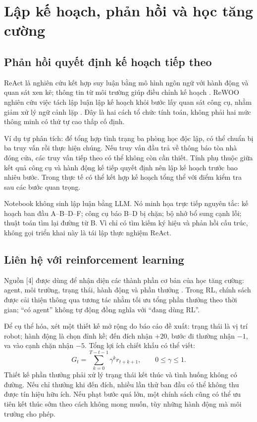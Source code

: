 \documentclass[12pt,a4paper]{article}
\begin{document}
\par
\section{Lập kế hoạch, phản hồi và học tăng cường}
\subsection{Phản hồi quyết định kế hoạch tiếp theo}
ReAct là nghiên cứu kết hợp suy luận bằng mô hình ngôn ngữ với hành động và quan sát
xen kẽ; thông tin từ môi trường giúp điều chỉnh kế hoạch \cite{react}. ReWOO nghiên cứu
việc tách lập luận lập kế hoạch khỏi bước lấy quan sát công cụ, nhằm giảm xử lý ngữ cảnh
lặp \cite{rewoo}. Đây là hai cách tổ chức tính toán, không phải hai mức thông minh
có thứ tự cao thấp cố định.

Ví dụ tự phân tích: để tổng hợp tình trạng ba phòng học độc lập, có thể chuẩn bị ba truy
vấn rồi thực hiện chúng. Nếu truy vấn đầu trả về thông báo tòa nhà đóng cửa, các truy
vấn tiếp theo có thể không còn cần thiết. Tính phụ thuộc giữa kết quả công cụ và hành
động kế tiếp quyết định nên lập kế hoạch trước bao nhiêu bước. Trong thực tế có thể
kết hợp kế hoạch tổng thể với điểm kiểm tra sau các bước quan trọng.

Notebook không sinh lập luận bằng LLM. Nó minh họa trực tiếp nguyên tắc: kế hoạch
ban đầu A--B--D--F; công cụ báo B--D bị chặn; bộ nhớ bổ sung cạnh lỗi; thuật toán tìm
lại đường từ B. Vì chỉ có tìm kiếm ký hiệu và phản hồi cấu trúc, không gọi triển khai
này là tái lập thực nghiệm ReAct.

\subsection{Liên hệ với reinforcement learning}
Nguồn [4] được dùng để nhận diện các thành phần cơ bản của học tăng cường: agent,
môi trường, trạng thái, hành động và phần thưởng \cite{gfg}. Trong RL, chính sách được
cải thiện thông qua tương tác nhằm tối ưu tổng phần thưởng theo thời gian; ``có agent''
không tự động đồng nghĩa với ``đang dùng RL''.

Để cụ thể hóa, xét một thiết kế mở rộng do báo cáo đề xuất: trạng thái là vị trí robot;
hành động là chọn đỉnh kề; đến đích nhận $+20$, bước đi thường nhận $-1$, va vào cạnh
chặn nhận $-5$. Tổng lợi ích chiết khấu có thể viết:
\[
G_t=\sum_{k=0}^{T-t-1}\gamma^k r_{t+k+1},\qquad 0\leq\gamma\leq1.
\]
Thiết kế phần thưởng phải xử lý trạng thái kết thúc và tình huống không có đường. Nếu
chỉ thưởng khi đến đích, nhiều lần thử ban đầu có thể không thu được tín hiệu hữu ích.
Nếu phạt bước quá lớn, một chính sách cũng có thể ưu tiên kết thúc sớm theo cách không
mong muốn, tùy những hành động mà môi trường cho phép.
\end{document}
